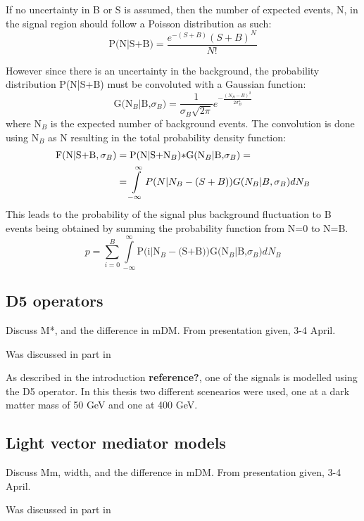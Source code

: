 If no uncertainty in B or S is assumed, then the number of expected events, N, in the signal region should follow a Poisson distribution as such:
\begin{equation}
\text{P(N|S+B)}=\frac{e^{-(S+B)}(S+B)^N}{N!}
\end{equation} 

However since there is an uncertainty in the background, the probability distribution P(N|S+B) must be convoluted with a Gaussian function:
\begin{equation}
 \text{G(N$_B$|B,$\sigma_B$)}=\frac{1}{\sigma_B \sqrt{2 \pi}} e^{-\frac{(N_B-B)^2}{2\sigma_B^2}}
\end{equation}
where N$_B$ is the expected number of background events. The convolution is done using N$_B$ as N resulting in the total probability density function:
\begin{align}
\text{F(N|S+B},\sigma_B) &= \text{P(N|S+N$_B$)$\ast$G(N$_B$|B,$\sigma_B$)}= \notag \\
&=\int\limits_{-\infty}^{\infty}P(N|N_B - (S+B))G(N_B|B,\sigma_B) dN_B
\end{align}
This leads to the probability of the signal plus background fluctuation to B events being obtained by summing the probability function from N=0 to N=B.
\begin{equation}
p = \sum\limits_{i=0}^{B} \int\limits_{-\infty}^{\infty} \text{P(i|N$_B - $(S+B))G(N$_B$|B,$\sigma_B$)} dN_B
\end{equation}



\subsection{D5 operators}
Discuss M*, and the difference in mDM. From presentation given, 3-4 April. 

Was discussed in part in 

As described in the introduction \textbf{reference?}, one of the signals is modelled using the D5 operator. In this thesis two different scenearios were used, one at a dark matter mass of 50 GeV and one at 400 GeV.

\subsection{Light vector mediator models}
Discuss Mm, width, and the difference in mDM. From presentation given, 3-4 April.

Was discussed in part in 


